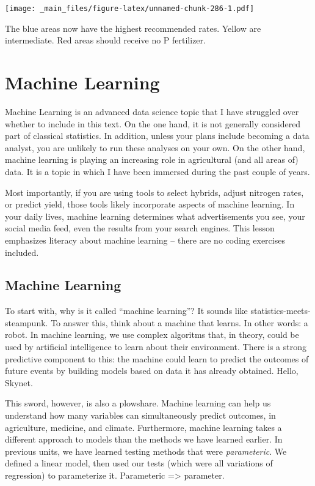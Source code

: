 \documentclass[
]{book}
\begin{document}
\texttt{[image: \_main\_files/figure-latex/unnamed-chunk-286-1.pdf]}

The blue areas now have the highest recommended rates. Yellow are intermediate. Red areas should receive no P fertilizer.

\hypertarget{machine-learning}{%
\chapter{Machine Learning}\label{machine-learning}}

Machine Learning is an advanced data science topic that I have struggled over whether to include in this text. On the one hand, it is not generally considered part of classical statistics. In addition, unless your plans include becoming a data analyst, you are unlikely to run these analyses on your own. On the other hand, machine learning is playing an increasing role in agricultural (and all areas of) data. It is a topic in which I have been immersed during the past couple of years.

Most importantly, if you are using tools to select hybrids, adjust nitrogen rates, or predict yield, those tools likely incorporate aspects of machine learning. In your daily lives, machine learning determines what advertisements you see, your social media feed, even the results from your search engines. This lesson emphasizes literacy about machine learning -- there are no coding exercises included.

\hypertarget{machine-learning-1}{%
\section{Machine Learning}\label{machine-learning-1}}

To start with, why is it called ``machine learning''? It sounds like statistics-meets-steampunk. To answer this, think about a machine that learns. In other words: a robot. In machine learning, we use complex algoritms that, in theory, could be used by artificial intelligence to learn about their environment. There is a strong predictive component to this: the machine could learn to predict the outcomes of future events by building models based on data it has already obtained. Hello, Skynet.

This sword, however, is also a plowshare. Machine learning can help us understand how many variables can simultaneously predict outcomes, in agriculture, medicine, and climate. Furthermore, machine learning takes a different approach to models than the methods we have learned earlier. In previous units, we have learned testing methods that were \emph{parameteric}. We defined a linear model, then used our tests (which were all variations of regression) to parameterize it. Parameteric =\textgreater{} parameter.
\end{document}
